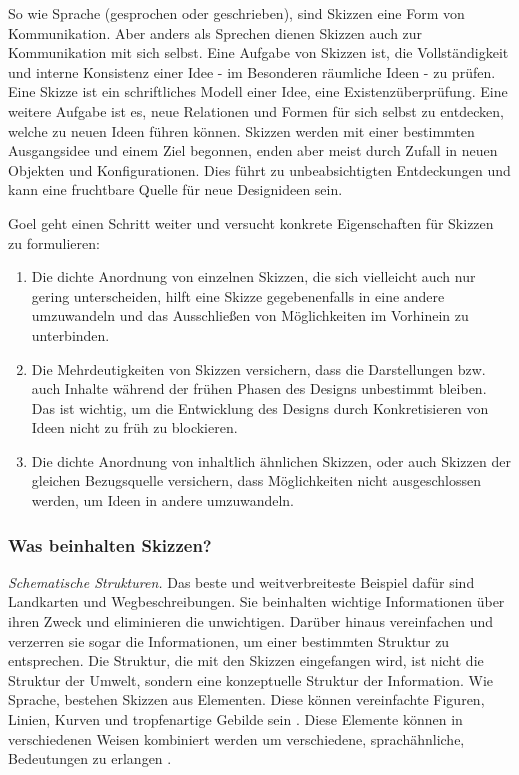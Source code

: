 \medskip So wie Sprache (gesprochen oder geschrieben), sind Skizzen eine Form von Kommunikation. Aber anders als Sprechen dienen Skizzen auch zur Kommunikation mit sich selbst. Eine Aufgabe von Skizzen ist, die Vollständigkeit und interne Konsistenz einer Idee - im Besonderen räumliche Ideen - zu prüfen. Eine Skizze ist ein schriftliches Modell einer Idee, eine Existenzüberprüfung. Eine weitere Aufgabe ist es, neue Relationen und Formen für sich selbst zu entdecken, welche zu neuen Ideen führen können. Skizzen werden mit einer bestimmten Ausgangsidee und einem Ziel begonnen, enden aber meist durch Zufall in neuen Objekten und Konfigurationen. Dies führt zu unbeabsichtigten Entdeckungen und kann eine fruchtbare Quelle für neue Designideen sein. \citep{Tversky:2002}

\medskip Goel geht einen Schritt weiter und versucht konkrete Eigenschaften für Skizzen zu formulieren: 
\begin{enumerate}
	\item Die dichte Anordnung von einzelnen Skizzen, die sich vielleicht auch nur gering unterscheiden, hilft eine Skizze gegebenenfalls in eine andere umzuwandeln und das Ausschließen von Möglichkeiten im Vorhinein zu unterbinden.
	\item Die Mehrdeutigkeiten von Skizzen versichern, dass die Darstellungen bzw. auch Inhalte während der frühen Phasen des Designs unbestimmt bleiben. Das ist wichtig, um die Entwicklung des Designs durch Konkretisieren von Ideen nicht zu früh zu blockieren.
	\item Die dichte Anordnung von inhaltlich ähnlichen Skizzen, oder auch Skizzen der gleichen Bezugsquelle versichern, dass Möglichkeiten nicht ausgeschlossen werden, um Ideen in andere umzuwandeln.
\end{enumerate}
\begin{flushright}\citep{Goel:1995}\end{flushright}

\subsubsection{Was beinhalten Skizzen?} 
\emph{Schematische Strukturen.} Das beste und weitverbreiteste Beispiel dafür sind Landkarten und Wegbeschreibungen. Sie beinhalten wichtige Informationen über ihren Zweck und eliminieren die unwichtigen. Darüber hinaus vereinfachen und verzerren sie sogar die Informationen, um einer bestimmten Struktur zu entsprechen. Die Struktur, die mit den Skizzen eingefangen wird, ist nicht die Struktur der Umwelt, sondern eine konzeptuelle Struktur der Information. Wie Sprache, bestehen Skizzen aus Elementen. Diese können vereinfachte Figuren, Linien, Kurven und tropfenartige Gebilde sein \citep{Tversky:2000}. Diese Elemente können in verschiedenen Weisen kombiniert werden um verschiedene, sprachähnliche, Bedeutungen zu erlangen \citep{Goodman:1968}.

